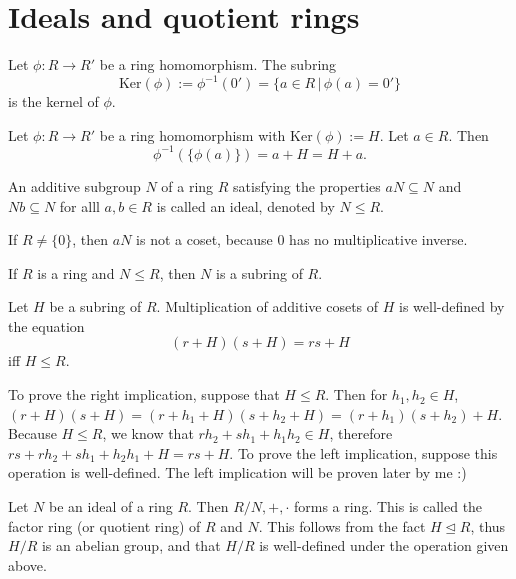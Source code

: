 \documentclass{article}
\begin{document}
\section{Ideals and quotient rings}
\begin{defi}[Kernel]
	Let \(\phi:R\rightarrow R'\) be a ring homomorphism. The subring
	\begin{equation*}
		\text{Ker}(\phi):=\phi^{-1}(0')=\{a\in R\,|\,\phi(a)=0'\}
	\end{equation*}
	is the kernel of \(\phi\).
\end{defi}
\begin{thm}
	Let \(\phi:R\rightarrow R'\) be a ring homomorphism with Ker\((\phi):=H\). Let \(a\in R\). Then
	\begin{equation*}
		\phi^{-1}(\{\phi(a)\})=a+H=H+a.
	\end{equation*}
\end{thm}
\begin{defi}[Ideal]
	An additive subgroup \(N\) of a ring \(R\) satisfying the properties \(aN\subseteq N\) and \(Nb\subseteq N\) for alll \(a,b\in R\) is called an ideal, denoted by \(N\leq R\).
\end{defi}
\begin{rema}
	If \(R\neq\{0\}\), then \(aN\) is not a coset, because \(0\) has no multiplicative inverse.
\end{rema}
\begin{lem}
	If \(R\) is a ring and \(N\leq R\), then \(N\) is a subring of \(R\).
\end{lem}
\begin{thm}
	Let \(H\) be a subring of \(R\). Multiplication of additive cosets of \(H\) is well-defined by the equation
	\begin{equation*}
		(r+H)(s+H)=rs+H
	\end{equation*}
	iff \(H\leq R\).
	\begin{IEEEproof}
		To prove the right implication, suppose that \(H\leq R\). Then for \(h_1,h_2\in H\), \((r+H)(s+H)=(r+h_1+H)(s+h_2+H)=(r+h_1)(s+h_2)+H\). Because \(H\leq R\), we know that \(rh_2+sh_1+h_1h_2\in H\), therefore \(rs+rh_2+sh_1+h_2h_1+H=rs+H\). To prove the left implication, suppose this operation is well-defined. The left implication will be proven later by me :)
	\end{IEEEproof}
\end{thm}
\begin{cor}
	Let \(N\) be an ideal of a ring \(R\). Then \(R/N,+,\cdot\) forms a ring. This is called the factor ring (or quotient ring) of \(R\) and \(N\). This follows from the fact \(H\trianglelefteq R\), thus \(H/R\) is an abelian group, and that \(H/R\) is well-defined under the operation given above.
\end{cor}
\end{document}
